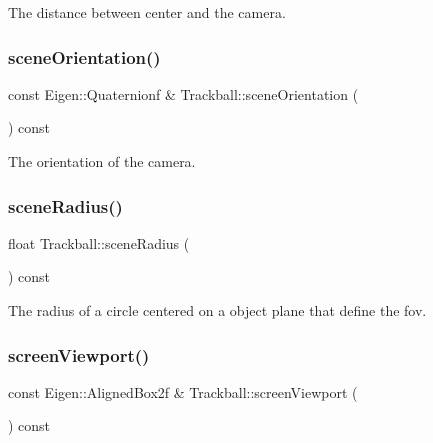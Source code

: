 The distance between {\ttfamily center} and the camera. 

\mbox{\label{class_trackball_a3ee1a7c88f90ac00ffab791dd8704ef2}} 
\subsubsection{\texorpdfstring{scene\+Orientation()}{sceneOrientation()}}
{\footnotesize\ttfamily const Eigen\+::\+Quaternionf \& Trackball\+::scene\+Orientation (\begin{DoxyParamCaption}{ }\end{DoxyParamCaption}) const}



The orientation of the camera. 

\mbox{\label{class_trackball_acd26e3c6e72d935e556e6b10bd2a0c1d}} 
\subsubsection{\texorpdfstring{scene\+Radius()}{sceneRadius()}}
{\footnotesize\ttfamily float Trackball\+::scene\+Radius (\begin{DoxyParamCaption}{ }\end{DoxyParamCaption}) const}



The radius of a circle centered on a object plane that define the fov. 

\mbox{\label{class_trackball_a42799fa68d03eab4dbcee55e3dfea55e}} 
\subsubsection{\texorpdfstring{screen\+Viewport()}{screenViewport()}}
{\footnotesize\ttfamily const Eigen\+::\+Aligned\+Box2f \& Trackball\+::screen\+Viewport (\begin{DoxyParamCaption}{ }\end{DoxyParamCaption}) const}



